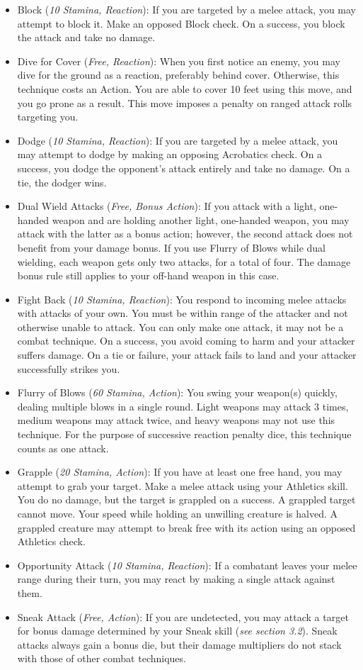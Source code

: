 \documentclass[12pt]{book}
\begin{document}
\begin{itemize}
	\item Block (\textit{10 Stamina, Reaction}): If you are targeted by a melee attack, you may attempt to block it. Make an opposed Block check. On a success, you block the attack and take no damage.
	\item Dive for Cover (\textit{Free, Reaction}): When you first notice an enemy, you may dive for the ground as a reaction, preferably behind cover. Otherwise, this technique costs an Action. You are able to cover 10 feet using this move, and you go prone as a result. This move imposes a penalty on ranged attack rolls targeting you.
	\item Dodge (\textit{10 Stamina, Reaction}): If you are targeted by a melee attack, you may attempt to dodge by making an opposing Acrobatics check. On a success, you dodge the opponent's attack entirely and take no damage. On a tie, the dodger wins.
	\item Dual Wield Attacks (\textit{Free, Bonus Action}): If you attack with a light, one-handed weapon and are holding another light, one-handed weapon, you may attack with the latter as a bonus action; however, the second attack does not benefit from your damage bonus. If you use Flurry of Blows while dual wielding, each weapon gets only two attacks, for a total of four. The damage bonus rule still applies to your off-hand weapon in this case.
	\item Fight Back (\textit{10 Stamina, Reaction}): You respond to incoming melee attacks with attacks of your own. You must be within range of the attacker and not otherwise unable to attack. You can only make one attack, it may not be a combat technique. On a success, you avoid coming to harm and your attacker suffers damage. On a tie or failure, your attack fails to land and your attacker successfully strikes you.
	\item Flurry of Blows (\textit{60 Stamina, Action}): You swing your weapon(s) quickly, dealing multiple blows in a single round. Light weapons may attack 3 times, medium weapons may attack twice, and heavy weapons may not use this technique. For the purpose of successive reaction penalty dice, this technique counts as one attack.
	\item Grapple (\textit{20 Stamina, Action}): If you have at least one free hand, you may attempt to grab your target. Make a melee attack using your Athletics skill. You do no damage, but the target is grappled on a success. A grappled target cannot move. Your speed while holding an unwilling creature is halved. A grappled creature may attempt to break free with its action using an opposed Athletics check.
	\item Opportunity Attack (\textit{10 Stamina, Reaction}): If a combatant leaves your melee range during their turn, you may react by making a single attack against them.
	\item Sneak Attack (\textit{Free, Action}): If you are undetected, you may attack a target for bonus damage determined by your Sneak skill (\textit{see section 3.2}). Sneak attacks always gain a bonus die, but their damage multipliers do not stack with those of other combat techniques.
\end{itemize}
\end{document}
